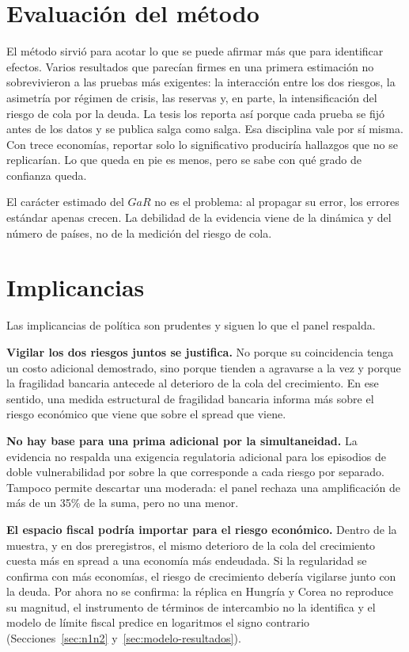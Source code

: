\section{Evaluación del método}
\label{sec:disc-metodo}

El método sirvió para acotar lo que se puede afirmar más que para identificar efectos. Varios resultados que parecían firmes en una primera estimación no sobrevivieron a las pruebas más exigentes: la interacción entre los dos riesgos, la asimetría por régimen de crisis, las reservas y, en parte, la intensificación del riesgo de cola por la deuda. La tesis los reporta así porque cada prueba se fijó antes de los datos y se publica salga como salga. Esa disciplina vale por sí misma. Con trece economías, reportar solo lo significativo produciría hallazgos que no se replicarían. Lo que queda en pie es menos, pero se sabe con qué grado de confianza queda.

El carácter estimado del $GaR$ no es el problema: al propagar su error, los errores estándar apenas crecen. La debilidad de la evidencia viene de la dinámica y del número de países, no de la medición del riesgo de cola.

\section{Implicancias}

Las implicancias de política son prudentes y siguen lo que el panel respalda.

\textbf{Vigilar los dos riesgos juntos se justifica.} No porque su coincidencia tenga un costo adicional demostrado, sino porque tienden a agravarse a la vez y porque la fragilidad bancaria antecede al deterioro de la cola del crecimiento. En ese sentido, una medida estructural de fragilidad bancaria informa más sobre el riesgo económico que viene que sobre el spread que viene.

\textbf{No hay base para una prima adicional por la simultaneidad.} La evidencia no respalda una exigencia regulatoria adicional para los episodios de doble vulnerabilidad por sobre la que corresponde a cada riesgo por separado. Tampoco permite descartar una moderada: el panel rechaza una amplificación de más de un 35\% de la suma, pero no una menor.

\textbf{El espacio fiscal podría importar para el riesgo económico.} Dentro de la muestra, y en dos preregistros, el mismo deterioro de la cola del crecimiento cuesta más en spread a una economía más endeudada. Si la regularidad se confirma con más economías, el riesgo de crecimiento debería vigilarse junto con la deuda. Por ahora no se confirma: la réplica en Hungría y Corea no reproduce su magnitud, el instrumento de términos de intercambio no la identifica y el modelo de límite fiscal predice en logaritmos el signo contrario (Secciones~\ref{sec:n1n2} y~\ref{sec:modelo-resultados}).

